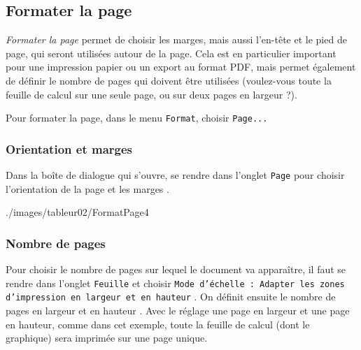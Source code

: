 


\subsection{Formater la page}\label{Calc2FormaterPage} 

\emph{Formater la page} permet de choisir les marges, mais aussi l'en-tête et le pied de page, qui seront utilisées autour de la page. Cela est en particulier important pour une impression papier ou un export au format PDF, mais permet également de définir le nombre de pages qui doivent être utilisées (voulez-vous toute la feuille de calcul sur une seule page, ou sur deux pages en largeur ?).

\vspace{12pt}

Pour formater la page, dans le menu \texttt{Format}, choisir \texttt{Page...}  




\subsubsection{Orientation et marges}  

Dans la boîte de dialogue qui s'ouvre, se rendre dans l'onglet \texttt{Page} pour choisir l'orientation de la page  et les marges .

%
                {./images/tableur02/FormatPage4}{\textwidth}  


\subsubsection{Nombre de pages}

Pour choisir le nombre de pages sur lequel le document va apparaître, il faut se rendre dans l'onglet \texttt{Feuille} et choisir \texttt{Mode d'échelle : Adapter les zones d'impression en largeur et en hauteur} . On définit ensuite le nombre de pages en largeur et en hauteur . Avec le réglage une page en largeur et une page en hauteur, comme dans cet exemple, toute la feuille de calcul (dont le graphique) sera imprimée sur une page unique.     

